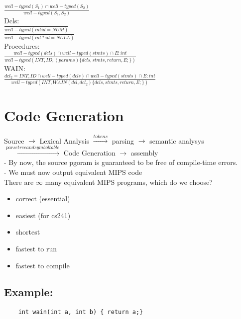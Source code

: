 \documentclass[12pt]{article}
\begin{document}
	$\frac{well-typed(S_1) \cap well-typed(S_2)}{well-typed(S_1,S_2)}$\\
	
	Dcls:\\
	$\frac{}{well-typed(int id = NUM)}$\\
	$\frac{}{well-typed(int *id = NULL)}$\\
	
	Procedures:\\
	$\frac{well-typed(dcls) \cap well-typed(stmts) \cap E: int}{well-typed(INT, ID, (params)\{dcls, stmts, return, E; \})}$\\
	
	WAIN:\\
	$\frac{dcl_2=INT,ID \cap well-typed(dcls) \cap well-typed(stmts) \cap E: int}{well-typed(INT, WAIN(dcl, dcl_2)\{dcls, stmts, return, E;\})}$\\
	
	\section*{Code Generation}
	Source $\rightarrow$ Lexical Analysis $\overset{tokens}{\rightarrow}$ parsing $\rightarrow$ semantic analysys $\overset{parse tree and symbol table} {\rightarrow}$ Code Generation $\rightarrow$ assembly\\
	
	- By now, the source pgoram is guaranteed to be free of compile-time errors.\\
	- We must now output equivalent MIPS code\\
	
	There are $\infty$ many equivalent MIPS programs, which do we choose?\\
	\begin{itemize}
		\item correct (essential)
		\item easiest (for cs241)
		\item shortest
		\item fastest to run
		\item fastest to compile
	\end{itemize}
	
	\subsection{Example:}
	\begin{verbatim}
	int wain(int a, int b) { return a;}
	\end{verbatim}
	
\end{document}
